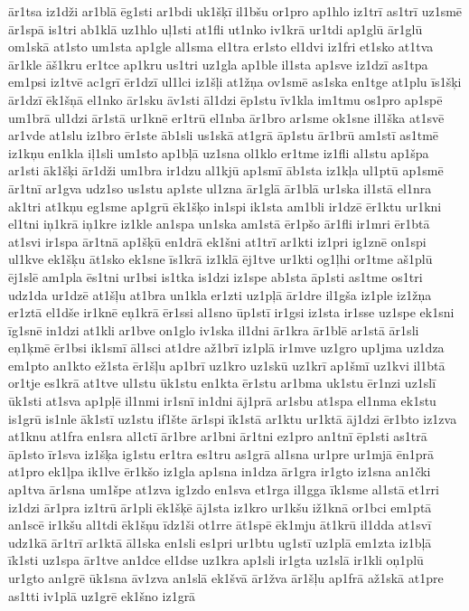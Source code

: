 {ār1tsa
iz1dži
ar1blā
ēg1sti
ar1bdi
uk1šķī
il1bšu
or1pro
ap1hlo
iz1trī
as1trī
uz1smē
ār1spā
is1tri
ab1klā
uz1hlo
uļ1sti
at1fli
ut1nko
iv1krā
ur1tdi
ap1glū
ār1glū
om1skā
at1sto
um1sta
ap1gle
al1sma
el1tra
er1sto
el1dvi
iz1fri
et1sko
at1tva
ār1kle
āš1kru
er1tce
ap1kru
us1tri
uz1gla
ap1ble
il1sta
ap1sve
iz1dzī
as1tpa
em1psi
iz1tvē
ac1grī
ēr1dzī
ul1lci
iz1šļi
at1žņa
ov1smē
as1ska
en1tge
at1plu
īs1šķi
ār1dzī
ēk1šņā
el1nko
ār1sku
āv1sti
āl1dzi
ēp1stu
īv1kla
im1tmu
os1pro
ap1spē
um1brā
ul1dzi
ār1stā
ur1knē
er1trū
el1nba
ār1bro
ar1sme
ok1sne
il1ška
at1svē
ar1vde
at1slu
iz1bro
ēr1ste
āb1sli
us1skā
at1grā
āp1stu
ār1brū
am1stī
as1tmē
iz1kņu
en1kla
iļ1sli
um1sto
ap1bļā
uz1sna
ol1klo
er1tme
iz1fli
al1stu
ap1špa
ar1sti
āk1šķi
ār1dži
um1bra
ir1dzu
al1kjū
ap1smī
āb1sta
iz1kļa
ul1ptū
ap1smē
ār1tnī
ar1gva
udz1so
us1stu
ap1ste
ul1zna
ār1glā
ār1blā
ur1ska
il1stā
el1nra
ak1tri
at1kņu
eg1sme
ap1grū
ēk1šķo
in1spi
ik1sta
am1bli
ir1dzē
ēr1ktu
ur1kni
el1tni
iņ1krā
iņ1kre
iz1kle
an1spa
un1ska
am1stā
ēr1pšo
ār1fli
ir1mri
ēr1btā
at1svi
ir1spa
ār1tnā
ap1šķū
en1drā
ek1šni
at1trī
ar1kti
iz1pri
ig1znē
on1spi
ul1kve
ek1šķu
āt1sko
ek1sne
īs1krā
iz1klā
ēj1tve
ur1kti
og1ļhi
or1tme
aš1plū
ēj1slē
am1pla
ēs1tni
ur1bsi
is1tka
is1dzi
iz1spe
ab1sta
āp1sti
as1tme
os1tri
udz1da
ur1dzē
at1šļu
at1bra
un1kla
er1zti
uz1pļā
ār1dre
il1gša
iz1ple
iz1žņa
er1ztā
el1dše
ir1knē
eņ1krā
ēr1ssi
al1sno
ūp1stī
ir1gsi
iz1sta
ir1sse
uz1spe
ek1sni
īg1snē
in1dzi
at1kli
ar1bve
on1glo
iv1ska
il1dni
ār1kra
ār1blē
ar1stā
ār1sli
eņ1ķmē
ēr1bsi
ik1smī
āl1sci
at1dre
až1brī
iz1plā
ir1mve
uz1gro
up1jma
uz1dza
em1pto
an1kto
ež1sta
ēr1šļu
ap1brī
uz1kro
uz1skū
uz1krī
ap1šmī
uz1kvi
il1btā
or1tje
es1krā
at1tve
ul1stu
ūk1stu
en1kta
ēr1stu
ar1bma
uk1stu
ēr1nzi
uz1slī
ūk1sti
at1sva
ap1pļē
il1nmi
ir1snī
in1dni
āj1prā
ar1sbu
at1spa
el1nma
ek1stu
is1grū
is1nle
āk1stī
uz1stu
if1šte
ār1spi
īk1stā
ar1ktu
ur1ktā
āj1dzi
ēr1bto
iz1zva
at1knu
at1fra
en1sra
al1ctī
ār1bre
ar1bni
ār1tni
ez1pro
an1tnī
ēp1sti
as1trā
āp1sto
īr1sva
iz1šķa
ig1stu
er1tra
es1tru
as1grā
al1sna
ur1pre
ur1mjā
ēn1prā
at1pro
ek1ļpa
ik1lve
ēr1kšo
iz1gla
ap1sna
in1dza
ār1gra
ir1gto
iz1sna
an1čki
ap1tva
ār1sna
um1špe
at1zva
ig1zdo
en1sva
et1rga
il1gga
īk1sme
al1stā
et1rri
iz1dzi
ār1pra
iz1trū
ār1pli
ēk1šķē
āj1sta
iz1kro
ur1kšu
iž1knā
or1bci
em1ptā
an1scē
ir1kšu
al1tdi
ēk1šņu
īdz1ši
ot1rre
āt1spē
ēk1mju
āt1krū
il1dda
at1svī
udz1kā
ār1trī
ar1ktā
āl1ska
en1sli
es1pri
ur1btu
ug1stī
uz1plā
em1zta
iz1bļā
īk1sti
uz1spa
ār1tve
an1dce
el1dse
uz1kra
ap1sli
ir1gta
uz1slā
ir1kli
oņ1plū
ur1gto
an1grē
ūk1sna
āv1zva
an1slā
ek1švā
ār1žva
ār1šļu
ap1frā
až1skā
at1pre
as1tti
iv1plā
uz1grē
ek1šno
iz1grā
}
